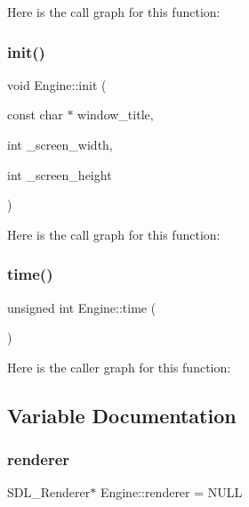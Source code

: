Here is the call graph for this function\+:
\mbox{\label{namespace_engine_a3c724ad52a22ba7fe7a6644171c35876}} 
\subsubsection{\texorpdfstring{init()}{init()}}
{\footnotesize\ttfamily void Engine\+::init (\begin{DoxyParamCaption}\item[{const char $\ast$}]{window\+\_\+title,  }\item[{int}]{\+\_\+screen\+\_\+width,  }\item[{int}]{\+\_\+screen\+\_\+height }\end{DoxyParamCaption})}

Here is the call graph for this function\+:
\mbox{\label{namespace_engine_adf0a70bcfb4c022242c96d53458d5f19}} 
\subsubsection{\texorpdfstring{time()}{time()}}
{\footnotesize\ttfamily unsigned int Engine\+::time (\begin{DoxyParamCaption}{ }\end{DoxyParamCaption})}

Here is the caller graph for this function\+:


\subsection{Variable Documentation}
\mbox{\label{namespace_engine_ad2484a396a99c02dc8c8b273bd189a7b}} 
\subsubsection{\texorpdfstring{renderer}{renderer}}
{\footnotesize\ttfamily S\+D\+L\+\_\+\+Renderer$\ast$ Engine\+::renderer = N\+U\+LL}

\mbox{\label{namespace_engine_a1386e582efc54cf5d9074e2dce5f259b}} 
